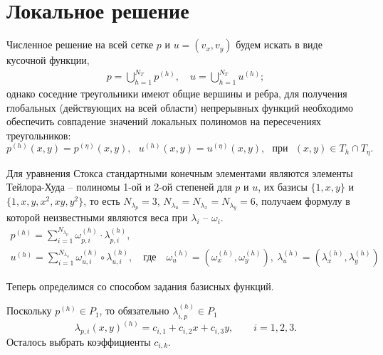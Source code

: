 \documentclass[a4paper,14pt]{extarticle}
\begin{document}
	\section{Локальное решение}
	Численное решение на всей сетке $p$ и $u=(v_x,v_y)$ будем искать в виде кусочной функции,
	\begin{equation}
		\begin{gathered}
			p = \bigcup_{h=1}^{N_T} p^{(h)},
			\quad
			u = \bigcup_{h=1}^{N_T} u^{(h)};
		\end{gathered}
	\end{equation}
	однако соседние треугольники имеют общие вершины и ребра, для получения глобальных (действующих на всей области) непрерывных функций необходимо обеспечить совпадение значений локальных полиномов на пересечениях треугольников:
	\begin{equation}
		p^{(h)}(x,y) = p^{(\eta)}(x,y),~~~
		u^{(h)}(x,y) = u^{(\eta)}(x,y),~~~
		\text{при}~~~(x,y)\in T_h\cap T_\eta.
	\end{equation}
	
 	Для уравнения Стокса стандартными конечным элементами являются элементы Тейлора-Худа -- полиномы 1-ой и 2-ой степеней для $p$ и $u$, их базисы $\{1,x,y\}$ и $\{1,x,y,x^2,xy,y^2\}$, то есть $N_{\lambda_{p}}=3$, $N_{\lambda_{u}} = N_{\lambda_{x}}= N_{\lambda_{y}}=6$, получаем формулу в которой неизвестными являются веса при $\lambda_i$ -- $\omega_i$.
	\begin{equation}
	\begin{gathered}
		p^{(h)} = \sum_{i=1}^{N_{\lambda_{p}}} \omega_{p,i}^{(h)} \cdot \lambda_{p,i}^{(h)},\\
		u^{(h)} = \sum_{i=1}^{N_{\lambda_{u}}} \omega_{u,i}^{(h)} \circ  \lambda_{u,i}^{(h)},\quad
		\text{где} \quad
		\omega_{u}^{(h)}=(\omega_{x}^{(h)},\omega_{y}^{(h)}),~
		\lambda_{u}^{(h)}=(\lambda_{x}^{(h)},\lambda_{y}^{(h)})
	\end{gathered}
	\end{equation}
	
	
	Теперь определимся со способом задания базисных функций.
	


	
	
	
	Поскольку $p^{(h)} \in P_1$, то обязательно $\lambda_{i,p}^{(h)} \in P_1$
	\[
	\lambda_{p,i}(x,y)^{(h)} =c_{i,1}+c_{i,2}x+c_{i,3}y,
	\qquad i=1,2,3.
	\]
	Осталось выбрать коэффициенты $c_{i,k}$.
	
\end{document}
